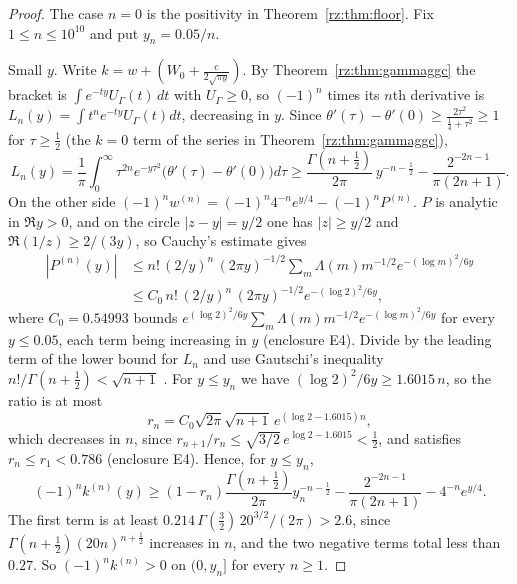 \begin{proof}
The case $n=0$ is the positivity in Theorem~\ref{rz:thm:floor}. Fix $1\le n\le10^{10}$ and put $y_n=0.05/n$.

Small $y$. Write $k=w+(W_0+\frac{c}{2\sqrt{\pi y}})$. By Theorem~\ref{rz:thm:gammaggc} the bracket is $\int e^{-ty}U_\Gamma(t)\,dt$ with $U_\Gamma\ge0$, so $(-1)^n$ times its $n$th derivative is $L_n(y)=\int t^ne^{-ty}U_\Gamma(t)dt$, decreasing in $y$. Since $\theta'(\tau)-\theta'(0)\ge\frac{2\tau^2}{\frac14+\tau^2}\ge1$ for $\tau\ge\frac12$ (the $k=0$ term of the series in Theorem~\ref{rz:thm:gammaggc}),
\[
L_n(y)=\frac1\pi\int_0^\infty\tau^{2n}e^{-y\tau^2}\bigl(\theta'(\tau)-\theta'(0)\bigr)d\tau\ge\frac{\Gamma(n+\frac12)}{2\pi}\,y^{-n-\frac12}-\frac{2^{-2n-1}}{\pi(2n+1)} .
\]
On the other side $(-1)^nw^{(n)}=(-1)^n4^{-n}e^{y/4}-(-1)^nP^{(n)}$. $P$ is analytic in $\Re y>0$, and on the circle $|z-y|=y/2$ one has $|z|\ge y/2$ and $\Re(1/z)\ge2/(3y)$, so Cauchy's estimate gives
\begin{align*}
|P^{(n)}(y)|&\le n!\,(2/y)^n\,(2\pi y)^{-1/2}\sum_m\Lambda(m)m^{-1/2}e^{-(\log m)^2/6y}\\
&\le C_0\,n!\,(2/y)^n\,(2\pi y)^{-1/2}e^{-(\log2)^2/6y},
\end{align*}
where $C_0=0.54993$ bounds $e^{(\log2)^2/6y}\sum_m\Lambda(m)m^{-1/2}e^{-(\log m)^2/6y}$ for every $y\le0.05$, each term being increasing in $y$ (enclosure E4). Divide by the leading term of the lower bound for $L_n$ and use Gautschi's inequality $n!/\Gamma(n+\frac12)<\sqrt{n+1}$ \cite[(5.6.4)]{DLMF}. For $y\le y_n$ we have $(\log2)^2/6y\ge1.6015\,n$, so the ratio is at most
\[
r_n=C_0\sqrt{2\pi}\sqrt{n+1}\,e^{(\log2-1.6015)n},
\]
which decreases in $n$, since $r_{n+1}/r_n\le\sqrt{3/2}\,e^{\log2-1.6015}<\frac12$, and satisfies $r_n\le r_1<0.786$ (enclosure E4). Hence, for $y\le y_n$,
\[
(-1)^nk^{(n)}(y)\ge(1-r_n)\frac{\Gamma(n+\frac12)}{2\pi}y_n^{-n-\frac12}-\frac{2^{-2n-1}}{\pi(2n+1)}-4^{-n}e^{y/4}.
\]
The first term is at least $0.214\,\Gamma(\frac32)\,20^{3/2}/(2\pi)>2.6$, since $\Gamma(n+\frac12)(20n)^{n+\frac12}$ increases in $n$, and the two negative terms total less than $0.27$. So $(-1)^nk^{(n)}>0$ on $(0,y_n]$ for every $n\ge1$.


\end{proof}
